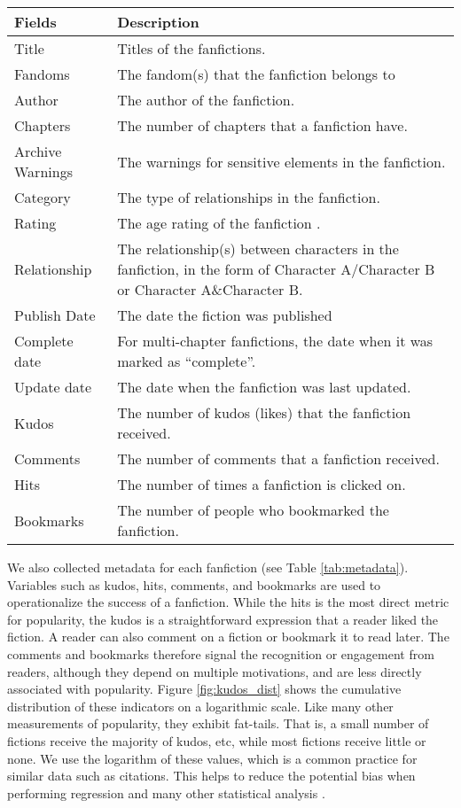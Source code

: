 \documentclass[letterpaper]{article} %
\begin{document}
\begin{table*}
\centering
\begin{tabular}[width=0.8\textwidth]{p{3cm}p{10cm}}
\toprule
Fields & Description \\ 
   \hline			
Title & Titles of the fanfictions.  \\
Fandoms & The fandom(s) that the fanfiction belongs to \\
Author & The author of the fanfiction.  \\
Chapters & The number of chapters that a fanfiction have. \\
Archive Warnings & The warnings for sensitive elements in the fanfiction. \\
Category & The type of relationships in the fanfiction. \\
Rating & The age rating of the fanfiction . \\
Relationship & The relationship(s) between characters in the fanfiction, in the form of Character A/Character B
or Character A\&Character B. \\
Publish Date & The date the fiction was published \\
Complete date & For multi-chapter fanfictions, the date when it was marked as ``complete''.\\
Update date & The date when the fanfiction was last updated. \\
\hline
Kudos & The number of kudos (likes) that the fanfiction received. \\
Comments & The number of comments that a fanfiction received.\\
Hits & The number of times a fanfiction is clicked on. \\
Bookmarks & The number of people who bookmarked the fanfiction.\\

\bottomrule
\end{tabular}
\caption{Metadata fields of the fanfictions.}
\label{tab:metadata}
\end{table*}%

We also collected metadata for each fanfiction (see Table \ref{tab:metadata}). Variables such as kudos, hits, comments, and bookmarks are used to operationalize the success of a fanfiction. While the hits is the most direct metric for popularity, the kudos is a straightforward expression that a reader liked the fiction. A reader can also comment on a fiction or bookmark it to read later. The comments and bookmarks therefore signal the recognition or engagement from readers, although they depend on multiple motivations, and are less directly associated with popularity. Figure \ref{fig:kudos_dist} shows the cumulative distribution of these indicators on a logarithmic scale. Like many other measurements of popularity, they exhibit fat-tails. That is, a small number of fictions receive the majority of kudos, etc, while most fictions receive little or none. We use the logarithm of these values, which is a common practice for similar data such as citations. This helps to reduce the potential bias when performing regression and many other statistical analysis \cite{thelwall2014regression}. 
\end{document}
